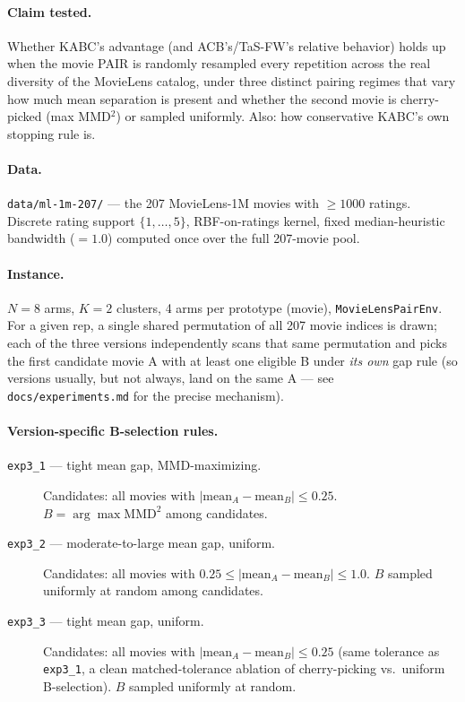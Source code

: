 \documentclass[11pt]{article}
\begin{document}
\paragraph{Claim tested.} Whether KABC's advantage (and ACB's/TaS-FW's
relative behavior) holds up when the movie PAIR is randomly resampled every
repetition across the real diversity of the MovieLens catalog, under three
distinct pairing regimes that vary how much mean separation is present and
whether the second movie is cherry-picked (max MMD$^2$) or sampled
uniformly. Also: how conservative KABC's own stopping rule is.

\paragraph{Data.} \texttt{data/ml-1m-207/} --- the 207 MovieLens-1M movies
with $\ge 1000$ ratings. Discrete rating support $\{1,\ldots,5\}$,
RBF-on-ratings kernel, fixed median-heuristic bandwidth ($=1.0$) computed
once over the full 207-movie pool.

\paragraph{Instance.} $N=8$ arms, $K=2$ clusters, 4 arms per prototype
(movie), \texttt{MovieLensPairEnv}. For a given rep, a single shared
permutation of all 207 movie indices is drawn; each of the three versions
independently scans that same permutation and picks the first candidate
movie A with at least one eligible B under \emph{its own} gap rule (so
versions usually, but not always, land on the same A --- see
\texttt{docs/experiments.md} for the precise mechanism).

\paragraph{Version-specific B-selection rules.}
\begin{description}
  \item[\texttt{exp3\_1} --- tight mean gap, MMD-maximizing.] Candidates: all
    movies with $|\text{mean}_A - \text{mean}_B| \le 0.25$. $B = \arg\max
    \mathrm{MMD}^2$ among candidates.
  \item[\texttt{exp3\_2} --- moderate-to-large mean gap, uniform.]
    Candidates: all movies with $0.25 \le |\text{mean}_A - \text{mean}_B|
    \le 1.0$. $B$ sampled uniformly at random among candidates.
  \item[\texttt{exp3\_3} --- tight mean gap, uniform.] Candidates: all movies
    with $|\text{mean}_A - \text{mean}_B| \le 0.25$ (same tolerance as
    \texttt{exp3\_1}, a clean matched-tolerance ablation of cherry-picking
    vs.\ uniform B-selection). $B$ sampled uniformly at random.
\end{description}
\end{document}
